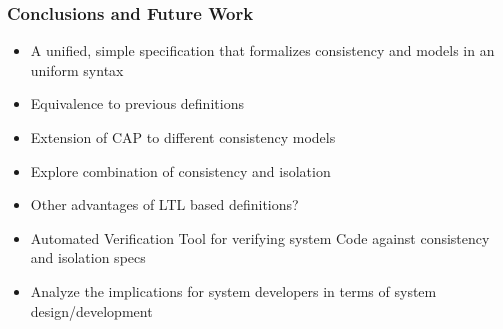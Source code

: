 \documentclass{beamer}
\begin{document}
\begin{frame}
\frametitle{Conclusions and Future Work}
\begin{itemize}
	\item A unified, simple specification that formalizes  consistency and models in an uniform syntax
	\item Equivalence to previous definitions
	\item Extension of CAP to different consistency models
	\item Explore combination of consistency and isolation
	\item Other advantages of LTL based definitions?
	\item Automated Verification Tool for verifying system Code against consistency and isolation specs
	\item Analyze the implications for system developers in terms of system design/development
\end{itemize}

\end{frame}
\end{document}
